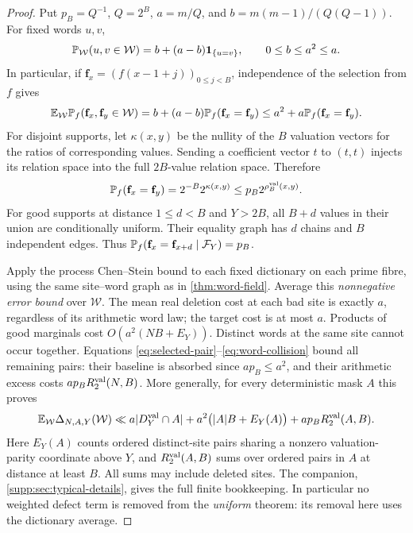 \begin{proof}
Put $p_B=Q^{-1}$, $Q=2^B$, $a=m/Q$, and
$b=m(m-1)/(Q(Q-1))$. For fixed words $u,v$,
\begin{equation}\label{eq:dictionary-selection}
 \mathbb P_{\mathcal W}(u,v\in\mathcal W)
       =b+(a-b)\mathbf 1_{\{u=v\}},\qquad 0\le b\le a^2\le a.
\end{equation}
In particular, if $\mathbf f_x=(f(x-1+j))_{0\le j<B}$, independence of the
selection from $f$ gives
\begin{equation}\label{eq:selected-pair}
 \mathbb E_{\mathcal W}\mathbb P_f(\mathbf f_x,\mathbf f_y\in\mathcal W)
       =b+(a-b)\mathbb P_f(\mathbf f_x=\mathbf f_y)
       \le a^2+a\mathbb P_f(\mathbf f_x=\mathbf f_y).
\end{equation}
For disjoint supports, let $\kappa(x,y)$ be the nullity of the $B$
valuation vectors for the ratios of corresponding values. Sending a
coefficient vector $t$ to $(t,t)$ injects its relation space into the
full $2B$-value relation space. Therefore
\begin{equation}\label{eq:word-collision}
 \mathbb P_f(\mathbf f_x=\mathbf f_y)=2^{-B}2^{\kappa(x,y)}
                     \le p_B2^{\rho_B^{\rm val}(x,y)}.
\end{equation}
For good supports at distance $1\le d<B$ and $Y>2B$, all $B+d$ values
in their union are conditionally uniform. Their equality graph has $d$
chains and $B$ independent edges. Thus
$\mathbb P_f(\mathbf f_x=\mathbf f_{x+d}\mid\mathcal F_Y)=p_B$.

Apply the process Chen--Stein bound to each fixed dictionary on each
prime fibre, using the same site--word graph as in
\cref{thm:word-field}. Average this \emph{nonnegative error bound} over
$\mathcal W$. The mean real deletion cost at each bad site is exactly
$a$, regardless of its arithmetic word law; the target cost is at most
$a$. Products of good marginals cost $O(a^2(NB+E_Y))$. Distinct words
at the same site cannot occur together. Equations
\eqref{eq:selected-pair}--\eqref{eq:word-collision} bound all remaining
pairs: their baseline is absorbed since $ap_B\le a^2$, and their
arithmetic excess costs $ap_BR_2^{\rm val}(N,B)$. More generally, for
every deterministic mask $A$ this proves
\begin{equation}\label{eq:typical-finite}
 \mathbb E_{\mathcal W}\Delta_{N,A,Y}(\mathcal W)
 \ll a|D_Y^{\rm val}\cap A|+
 a^2\bigl(|A|B+E_Y(A)\bigr)+ap_BR_2^{\rm val}(A,B).
\end{equation}
Here $E_Y(A)$ counts ordered distinct-site pairs sharing a nonzero valuation-parity
coordinate above $Y$, and $R_2^{\rm val}(A,B)$ sums over ordered pairs
in $A$ at distance at least $B$. All sums may include deleted sites.
The companion, \cref{supp:sec:typical-details}, gives the full finite
bookkeeping. In particular no weighted defect term is removed from the
\emph{uniform} theorem: its removal here uses the dictionary average.


\end{proof}
